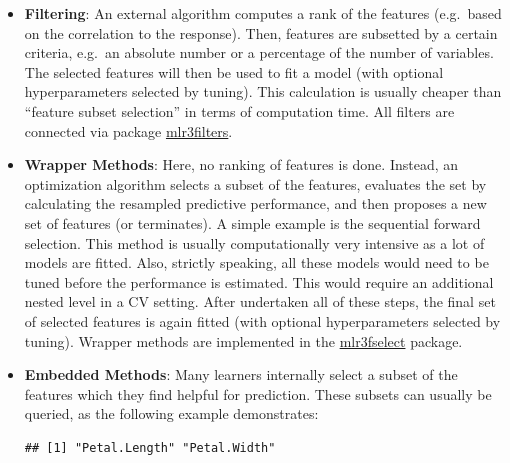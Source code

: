 \documentclass[
]{scrbook}
\newenvironment{Shaded}{\begin{snugshade}}{\end{snugshade}}
\newcommand{\CommentTok}[1]{\textcolor[rgb]{0.56,0.35,0.01}{\textit{#1}}}
\newcommand{\FunctionTok}[1]{\textcolor[rgb]{0.00,0.00,0.00}{#1}}
\newcommand{\NormalTok}[1]{#1}
\newcommand{\OtherTok}[1]{\textcolor[rgb]{0.56,0.35,0.01}{#1}}
\newcommand{\SpecialCharTok}[1]{\textcolor[rgb]{0.00,0.00,0.00}{#1}}
\newcommand{\StringTok}[1]{\textcolor[rgb]{0.31,0.60,0.02}{#1}}
\renewenvironment{Shaded} {\begin{snugshade}\small} {\end{snugshade}}
\begin{document}
\begin{itemize}
\item
  \textbf{Filtering}:
  An external algorithm computes a rank of the features (e.g.~based on the correlation to the response).
  Then, features are subsetted by a certain criteria, e.g.~an absolute number or a percentage of the number of variables.
  The selected features will then be used to fit a model (with optional hyperparameters selected by tuning).
  This calculation is usually cheaper than ``feature subset selection'' in terms of computation time.
  All filters are connected via package \href{https://mlr3filters.mlr-org.com}{mlr3filters}.
\item
  \textbf{Wrapper Methods}:
  Here, no ranking of features is done.
  Instead, an optimization algorithm selects a subset of the features, evaluates the set by calculating the resampled predictive performance, and then
  proposes a new set of features (or terminates).
  A simple example is the sequential forward selection.
  This method is usually computationally very intensive as a lot of models are fitted.
  Also, strictly speaking, all these models would need to be tuned before the performance is estimated.
  This would require an additional nested level in a CV setting.
  After undertaken all of these steps, the final set of selected features is again fitted (with optional hyperparameters selected by tuning).
  Wrapper methods are implemented in the \href{https://mlr3fselect.mlr-org.com}{mlr3fselect} package.
\item
  \textbf{Embedded Methods}:
  Many learners internally select a subset of the features which they find helpful for prediction.
  These subsets can usually be queried, as the following example demonstrates:

\begin{Shaded}
\end{Shaded}

\begin{verbatim}
## [1] "Petal.Length" "Petal.Width"
\end{verbatim}
\end{itemize}
\end{document}
